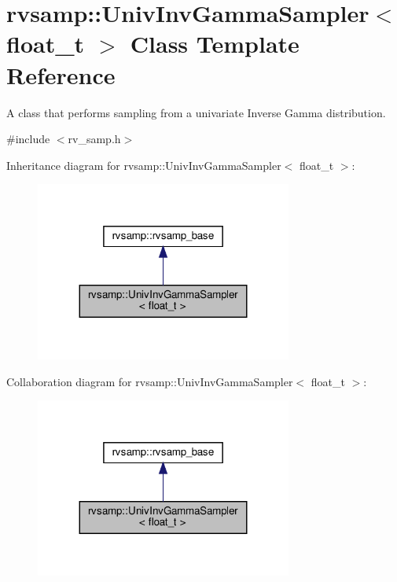 \hypertarget{classrvsamp_1_1UnivInvGammaSampler}{}\section{rvsamp\+:\+:Univ\+Inv\+Gamma\+Sampler$<$ float\+\_\+t $>$ Class Template Reference}
\label{classrvsamp_1_1UnivInvGammaSampler}


A class that performs sampling from a univariate Inverse Gamma distribution.  




{\ttfamily \#include $<$rv\+\_\+samp.\+h$>$}



Inheritance diagram for rvsamp\+:\+:Univ\+Inv\+Gamma\+Sampler$<$ float\+\_\+t $>$\+:\nopagebreak
\begin{figure}[H]
\begin{center}
\leavevmode
\includegraphics[width=239pt]{classrvsamp_1_1UnivInvGammaSampler__inherit__graph}
\end{center}
\end{figure}


Collaboration diagram for rvsamp\+:\+:Univ\+Inv\+Gamma\+Sampler$<$ float\+\_\+t $>$\+:\nopagebreak
\begin{figure}[H]
\begin{center}
\leavevmode
\includegraphics[width=239pt]{classrvsamp_1_1UnivInvGammaSampler__coll__graph}
\end{center}
\end{figure}
